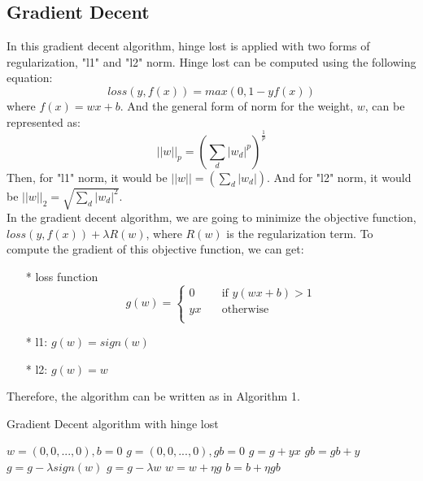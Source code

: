 \documentclass[11pt]{article}
\begin{document}
\subsection{Gradient Decent}
In this gradient decent algorithm, hinge lost is applied with two forms of regularization, "l1" and "l2" norm. Hinge lost can be computed using the following equation:
\begin{equation*}
loss(y,f(x)) = max(0, 1-yf(x))
\end{equation*}
where \(f(x) = wx+b\). And the general form of norm for the weight, \(w\), can be represented as:
\begin{equation*}
||w||_p = (\sum_{d} |w_d|^p)^{\frac{1}{p}}
\end{equation*}
Then, for "l1" norm, it would be \(||w|| = (\sum_{d} |w_d|)\). And for "l2" norm, it would be  \(||w||_2 = \sqrt{\sum_{d} |w_d|^2}\). \\
In the gradient decent algorithm, we are going to minimize the objective function, \(loss(y,f(x))+\lambda R(w)\), where \(R(w)\) is the regularization term. To compute the gradient of this objective function, we can get:
\begin{itemize}
\item[*] loss function
\begin{equation*}
g(w) =
  \begin{cases}
    0       & \quad \text{if } y(wx+b)>1\\
    yx           & \quad \text{otherwise}\\
  \end{cases}
\end{equation*}
\item[*] l1: \(g(w) = sign(w)\)
\item[*] l2: \(g(w) = w\)
\end{itemize}
Therefore, the algorithm can be written as in Algorithm 1.
\begin{algorithm}
\caption{Gradient Decent algorithm with hinge lost}
\begin{algorithmic}[1]
\State $w = (0,0,...,0), b = 0 $
\State$ g=(0,0,...,0), gb=0$
\State $g = g + yx$
\State$gb = gb + y$
\EndIf
\EndFor
{}
\State $g=g-\lambda sign(w)$
\State $g=g- \lambda w$
\EndIf
\State$w = w + \eta g$
\State$b = b + \eta gb$
\EndFor
\EndProcedure
\end{algorithmic}
\end{algorithm}
\end{document}
